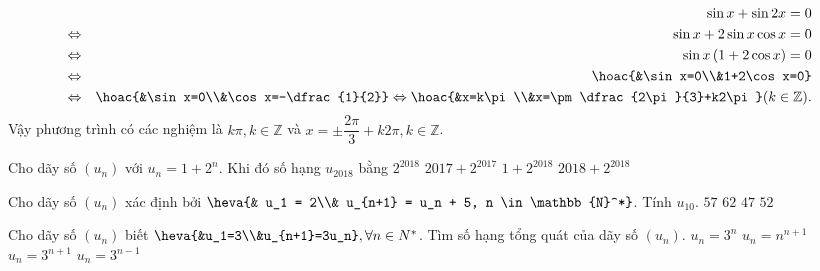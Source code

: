 \begin{bt}
{\begin{listEX}
			\allowdisplaybreaks
			\begin{eqnarray*}
				&&\sin x+\sin 2 x=0 \\
				&\Leftrightarrow& \sin x+2\sin x\cos x=0 \\
				&\Leftrightarrow& \sin x \left(1+2\cos x\right)=0 \\
				&\Leftrightarrow& \hoac{&\sin x=0\\&1+2\cos x=0} \\
				&\Leftrightarrow& \hoac{&\sin x=0\\&\cos x=-\dfrac{1}{2}}\Leftrightarrow \hoac{&x=k\pi\\&x=\pm \dfrac{2\pi}{3}+k2\pi} (k\in\mathbb{Z}).
			\end{eqnarray*}	
			Vậy phương trình có các nghiệm là $k\pi, k\in\mathbb{Z}$ và $x=\pm \dfrac{2\pi}{3}+k2\pi, k\in\mathbb{Z}$.
		\end{listEX}
	}
\end{bt}

\begin{ex}%
	Cho  dãy số $(u_n)$ với $u_n=1+2^n$. Khi đó số hạng $u_{2018}$ bằng
	 \choice
		{$2^{2018}$} 
		 {$2017+2^{2017}$}
		{\True$1+2^{2018}$} 
		 {$2018+2^{2018}$}
\end{ex}

\begin{ex}%
	Cho dãy  số $(u_n)$ xác định bởi $\heva{& u_1 = 2\\& u_{n+1} = u_n + 5, n \in \mathbb{N}^*}$. Tính $u_{10}$.
	\choice 
		{$57$} 
		{$62$} 
		 {\True $47$}
		 {$52$}
\end{ex}

\begin{ex}%
	 Cho dãy số $\left(u_n\right)$ biết $\heva{&u_1=3\\&u_{n+1}=3u_n}, \forall n\in{N^*}$. Tìm số hạng tổng quát của dãy số $(u_n)$.
	 \choice
		{\True $u_n=3^n$} 
		 {$u_n=n^{n+1}$}
		 {$u_n=3^{n+1}$}
		 {$u_n=3^{n-1}$}
\end{ex}

